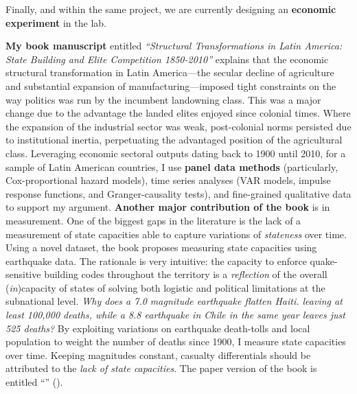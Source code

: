 \documentclass[10pt,stdletter,dateno,sigleft]{newlfm} %
\begin{document}
\begin{newlfm}
Finally, and within the same project, we are currently designing an {\bf economic experiment} in the lab. \unskip



{\bf My book manuscript} entitled \emph{``Structural Transformations in Latin America: State Building and Elite Competition 1850-2010''} explains that the economic structural transformation in Latin America---the secular decline of agriculture and substantial expansion of manufacturing---imposed tight constraints on the way politics was run by the incumbent landowning class. This was a major change due to the advantage the landed elites enjoyed since colonial times. Where the expansion of the industrial sector was weak, post-colonial norms persisted due to institutional inertia, perpetuating the advantaged position of the agricultural class. Leveraging economic sectoral outputs dating back to 1900 until 2010, for a sample of Latin American countries, I use {\bf panel data methods} (particularly, Cox-proportional hazard models), time series analyses (VAR models, impulse response functions, and Granger-causality tests), and fine-grained qualitative data to support my argument. {\bf Another major contribution of the book} is in measurement. One of the biggest gaps in the literature is the lack of a measurement of state capacities able to capture variations of \emph{stateness} over time. Using a novel dataset, the book proposes measuring state capacities using earthquake data. The rationale is very intuitive: the capacity to enforce quake-sensitive building codes throughout the territory is a \emph{reflection} of the overall (\emph{in})capacity of states of solving both logistic and political limitations at the subnational level. \emph{Why does a 7.0 magnitude earthquake flatten Haiti. leaving at least 100,000 deaths, while a 8.8 earthquake in Chile in the same year leaves just 525 deaths?} By exploiting  variations on earthquake death-tolls and local population to weight the number of deaths since 1900, I measure state capacities over time. Keeping magnitudes constant, casualty differentials should be attributed to the \emph{lack of state capacities}. The paper version of the book is entitled ``\href{https://github.com/hbahamonde/Earthquake_Paper/raw/master/Bahamonde_Earthquake_Paper.pdf}{{\unskip}}'' (\emph{\unskip}).






\end{newlfm}
\end{document}
